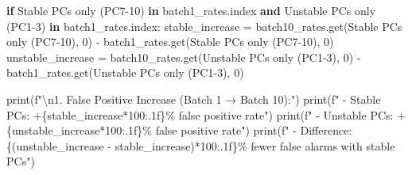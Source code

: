 \documentclass[
  letterpaper,
  DIV=11,
  numbers=noendperiod]{scrartcl}
\newenvironment{Shaded}{\begin{snugshade}}{\end{snugshade}}
\newcommand{\BuiltInTok}[1]{\textcolor[rgb]{0.00,0.23,0.31}{#1}}
\newcommand{\CharTok}[1]{\textcolor[rgb]{0.13,0.47,0.30}{#1}}
\newcommand{\ControlFlowTok}[1]{\textcolor[rgb]{0.00,0.23,0.31}{\textbf{#1}}}
\newcommand{\DecValTok}[1]{\textcolor[rgb]{0.68,0.00,0.00}{#1}}
\newcommand{\KeywordTok}[1]{\textcolor[rgb]{0.00,0.23,0.31}{\textbf{#1}}}
\newcommand{\NormalTok}[1]{\textcolor[rgb]{0.00,0.23,0.31}{#1}}
\newcommand{\OperatorTok}[1]{\textcolor[rgb]{0.37,0.37,0.37}{#1}}
\newcommand{\SpecialCharTok}[1]{\textcolor[rgb]{0.37,0.37,0.37}{#1}}
\newcommand{\SpecialStringTok}[1]{\textcolor[rgb]{0.13,0.47,0.30}{#1}}
\newcommand{\StringTok}[1]{\textcolor[rgb]{0.13,0.47,0.30}{#1}}
\renewenvironment{Shaded}{%
  \begin{tcolorbox}[%
    enhanced,%
    colback=codebg,%
    colframe=codebg,%
    borderline west={3pt}{0pt}{sectionblue},%
    fontupper=\small\ttfamily,%
    boxrule=0pt,%
    arc=0pt,%
    boxsep=5pt,%
    left=2mm,%
    right=2mm,%
    top=2mm,%
    bottom=2mm%
  ]%
}{%
  \end{tcolorbox}%
}
\begin{document}
\begin{Shaded}
\begin{Highlighting}[]
\ControlFlowTok{if} \StringTok{\textquotesingle{}Stable PCs only (PC7{-}10)\textquotesingle{}} \KeywordTok{in}\NormalTok{ batch1\_rates.index }\KeywordTok{and} \StringTok{\textquotesingle{}Unstable PCs only (PC1{-}3)\textquotesingle{}} \KeywordTok{in}\NormalTok{ batch1\_rates.index:}
\NormalTok{    stable\_increase }\OperatorTok{=}\NormalTok{ batch10\_rates.get(}\StringTok{\textquotesingle{}Stable PCs only (PC7{-}10)\textquotesingle{}}\NormalTok{, }\DecValTok{0}\NormalTok{) }\OperatorTok{{-}}\NormalTok{ batch1\_rates.get(}\StringTok{\textquotesingle{}Stable PCs only (PC7{-}10)\textquotesingle{}}\NormalTok{, }\DecValTok{0}\NormalTok{)}
\NormalTok{    unstable\_increase }\OperatorTok{=}\NormalTok{ batch10\_rates.get(}\StringTok{\textquotesingle{}Unstable PCs only (PC1{-}3)\textquotesingle{}}\NormalTok{, }\DecValTok{0}\NormalTok{) }\OperatorTok{{-}}\NormalTok{ batch1\_rates.get(}\StringTok{\textquotesingle{}Unstable PCs only (PC1{-}3)\textquotesingle{}}\NormalTok{, }\DecValTok{0}\NormalTok{)}
    
    \BuiltInTok{print}\NormalTok{(}\SpecialStringTok{f"}\CharTok{\textbackslash{}n}\SpecialStringTok{1. False Positive Increase (Batch 1 → Batch 10):"}\NormalTok{)}
    \BuiltInTok{print}\NormalTok{(}\SpecialStringTok{f"   {-} Stable PCs: +}\SpecialCharTok{\{}\NormalTok{stable\_increase}\OperatorTok{*}\DecValTok{100}\SpecialCharTok{:.1f\}}\SpecialStringTok{\% false positive rate"}\NormalTok{)}
    \BuiltInTok{print}\NormalTok{(}\SpecialStringTok{f"   {-} Unstable PCs: +}\SpecialCharTok{\{}\NormalTok{unstable\_increase}\OperatorTok{*}\DecValTok{100}\SpecialCharTok{:.1f\}}\SpecialStringTok{\% false positive rate"}\NormalTok{)}
    \BuiltInTok{print}\NormalTok{(}\SpecialStringTok{f"   {-} Difference: }\SpecialCharTok{\{}\NormalTok{(unstable\_increase }\OperatorTok{{-}}\NormalTok{ stable\_increase)}\OperatorTok{*}\DecValTok{100}\SpecialCharTok{:.1f\}}\SpecialStringTok{\% fewer false alarms with stable PCs"}\NormalTok{)}


\end{Highlighting}
\end{Shaded}
\end{document}
